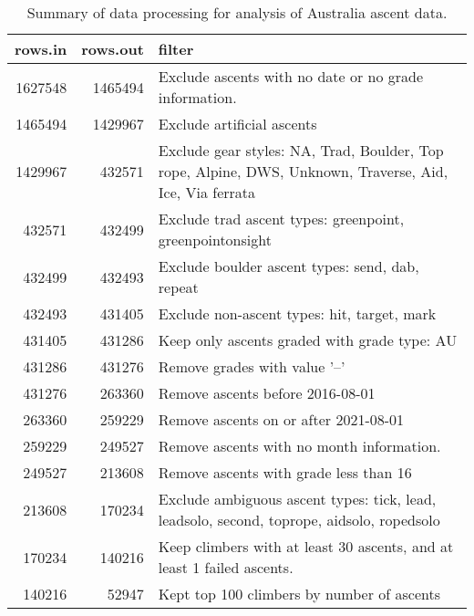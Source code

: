 \begin{table}[ht]
\centering
\begingroup\fontsize{9pt}{10pt}\selectfont
\begin{tabular}{rrl}
  \hline
{\bf rows.in} & {\bf rows.out} & {\bf filter} \\ 
  \hline
1627548 & 1465494 & Exclude ascents with no date or no grade information. \\ 
  1465494 & 1429967 & Exclude artificial ascents \\ 
  1429967 & 432571 & Exclude gear styles: NA, Trad, Boulder, Top rope, Alpine, DWS, Unknown, Traverse, Aid, Ice, Via ferrata \\ 
  432571 & 432499 & Exclude trad ascent types: greenpoint, greenpointonsight \\ 
  432499 & 432493 & Exclude boulder ascent types: send, dab, repeat \\ 
  432493 & 431405 & Exclude non-ascent types: hit, target, mark \\ 
  431405 & 431286 & Keep only ascents graded with grade type: AU \\ 
  431286 & 431276 & Remove grades with value '--' \\ 
  431276 & 263360 & Remove ascents before 2016-08-01 \\ 
  263360 & 259229 & Remove ascents on or after 2021-08-01 \\ 
  259229 & 249527 & Remove ascents with no month information. \\ 
  249527 & 213608 & Remove ascents with grade less than 16 \\ 
  213608 & 170234 & Exclude ambiguous ascent types: tick, lead, leadsolo, second, toprope, aidsolo, ropedsolo \\ 
  170234 & 140216 & Keep climbers with at least 30 ascents, and at least 1 failed ascents. \\ 
  140216 & 52947 & Kept top 100 climbers by number of ascents \\ 
   \hline
\end{tabular}
\endgroup
\caption{Summary of data processing for analysis of Australia ascent data.} 
\label{table-data-processing-aus}
\end{table}
